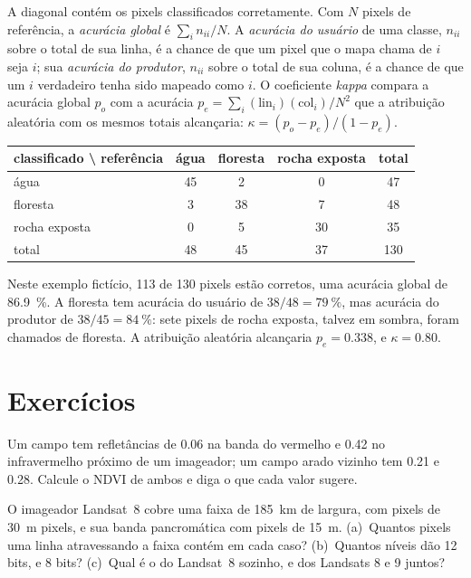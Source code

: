 A diagonal contém os pixels classificados corretamente. Com $N$ pixels de referência,
a \emph{acurácia global} é $\sum_i n_{ii}/N$. A \emph{acurácia do
usuário} de uma classe, $n_{ii}$ sobre o total de sua linha, é a chance de que um
pixel que o mapa chama de $i$ seja $i$; sua \emph{acurácia do produtor}, $n_{ii}$
sobre o total de sua coluna, é a chance de que um $i$ verdadeiro tenha sido mapeado como $i$. O
coeficiente \emph{kappa} compara a acurácia global $p_o$ com a
acurácia $p_e = \sum_i (\text{lin}_i)(\text{col}_i)/N^2$ que a atribuição aleatória
com os mesmos totais alcançaria: $\kappa = (p_o - p_e)/(1 -
p_e)$.

\begin{center}
\small
\begin{tabular}{l|ccc|c}
\hline
classificado \textbackslash{} referência & água & floresta & rocha exposta & total \\
\hline
água & 45 & 2 & 0 & 47 \\
floresta & 3 & 38 & 7 & 48 \\
rocha exposta & 0 & 5 & 30 & 35 \\
\hline
total & 48 & 45 & 37 & 130 \\
\hline
\end{tabular}
\end{center}

Neste exemplo fictício, 113 de 130 pixels estão corretos, uma acurácia
global de \qty{86.9}{\percent}. A floresta tem acurácia do usuário de
$38/48 = \qty{79}{\percent}$, mas acurácia do produtor de $38/45 =
\qty{84}{\percent}$: sete pixels de rocha exposta, talvez em sombra, foram
chamados de floresta. A atribuição aleatória alcançaria $p_e = 0.338$, e $\kappa =
0.80$.

\section{Exercícios}

\begin{exercise}[$\star$]\label{exo:b3:remote-sensing-gis:1}
Um campo tem refletâncias de 0.06 na banda do vermelho e 0.42 no
infravermelho próximo de um imageador; um campo arado vizinho tem 0.21 e
0.28. Calcule o NDVI de ambos e diga o que cada valor sugere.
\end{exercise}

\begin{exercise}[$\star$]\label{exo:b3:remote-sensing-gis:2}
O imageador Landsat~8 cobre uma faixa de \qty{185}{km} de largura, com pixels de \qty{30}{m}
pixels, e sua banda pancromática com pixels de \qty{15}{m}. (a)~Quantos
pixels uma linha atravessando a faixa contém em cada caso? (b)~Quantos níveis
dão 12 bits, e 8 bits? (c)~Qual é o  do Landsat~8
sozinho, e dos Landsats 8 e 9 juntos?
\end{exercise}

